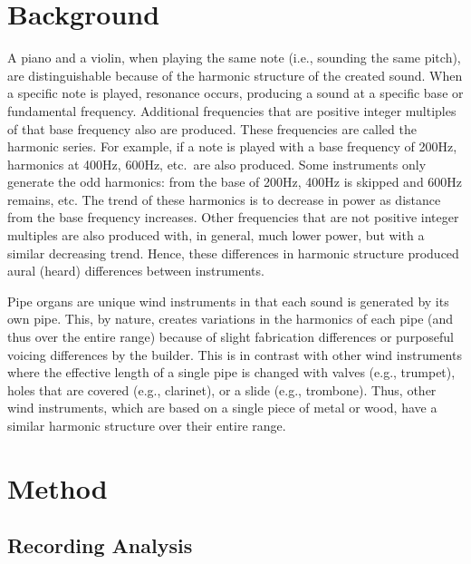 \documentclass[twocolumn]{article}
\begin{document}
\section{Background}

A piano and a violin, when playing the same note (i.e., sounding the same pitch), are distinguishable because of the harmonic structure of the created sound. When a specific note is played, resonance occurs, producing a sound at a specific base or fundamental frequency. Additional frequencies that are positive integer multiples of that base frequency also are produced. These frequencies are called the harmonic series. For example, if a note is played with a base frequency of 200Hz, harmonics at 400Hz, 600Hz, etc.\ are also produced. Some instruments only generate the odd harmonics: from the base of 200Hz, 400Hz is skipped and 600Hz remains, etc. The trend of these harmonics is to decrease in power as distance from the base frequency increases. Other frequencies that are not positive integer multiples are also produced with, in general, much lower power, but with a similar decreasing trend. Hence, these differences in harmonic structure produced aural (heard) differences between instruments.

Pipe organs are unique wind instruments in that each sound is generated by its own pipe. This, by nature, creates variations in the harmonics of each pipe (and thus over the entire range) because of slight fabrication differences or purposeful voicing differences by the builder. This is in contrast with other wind instruments where the effective length of a single pipe is changed with valves (e.g., trumpet), holes that are covered (e.g., clarinet), or a slide (e.g., trombone). Thus, other wind instruments, which are based on a single piece of metal or wood, have a similar harmonic structure over their entire range.

\section{Method}

\subsection{Recording Analysis}
\end{document}
